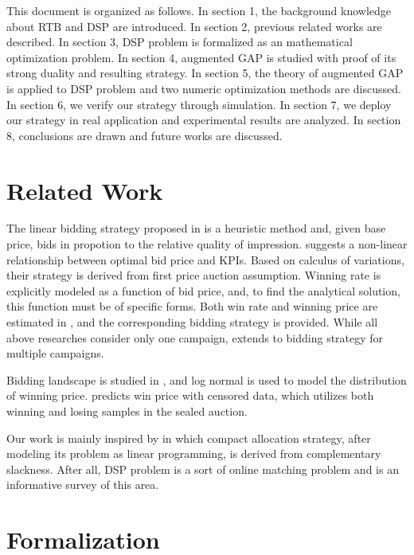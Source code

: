 \documentclass[sigconf]{acmart}
\begin{document}
This document is organized as follows.
In section 1, the background knowledge about RTB and DSP are introduced.
In section 2, previous related works are described.
In section 3, DSP problem is formalized as an mathematical optimization problem.
In section 4, augmented GAP is studied with proof of its strong duality and resulting strategy.
In section 5, the theory of augmented GAP is applied to DSP problem and two numeric optimization methods are discussed.
In section 6, we verify our strategy through simulation.
In section 7, we deploy our strategy in real application and experimental results are analyzed.
In section 8, conclusions are drawn and future works are discussed.

\section{Related Work}

The linear bidding strategy proposed in \cite{M6D} is a heuristic method and,
    given base price, bids in propotion to the relative quality of impression.
\cite{WeinanZhang2014} suggests a non-linear relationship between optimal bid price and KPIs.
Based on calculus of variations, their strategy is derived from first price auction assumption.
Winning rate is explicitly modeled as a function of bid price, and,
    to find the analytical solution, this function must be of specific forms.
Both win rate and winning price are estimated in \cite{XiangLi2014}, and the corresponding bidding strategy is provided.
While all above researches consider only one campaign,
    \cite{WeinanZhang2015} extends \cite{WeinanZhang2014} to bidding strategy for multiple campaigns.

Bidding landscape is studied in \cite{YingCui2011}, and log normal is used to model the distribution of winning price.
\cite{Wu2015} predicts win price with censored data, which utilizes both winning and losing samples in the sealed auction.

Our work is mainly inspired by \cite{YeChen2011} in which compact allocation strategy,
    after modeling its problem as linear programming, is derived from complementary slackness.
After all, DSP problem is a sort of online matching problem and \cite{Mehta} is an informative survey of this area.

\section{Formalization}
\end{document}
